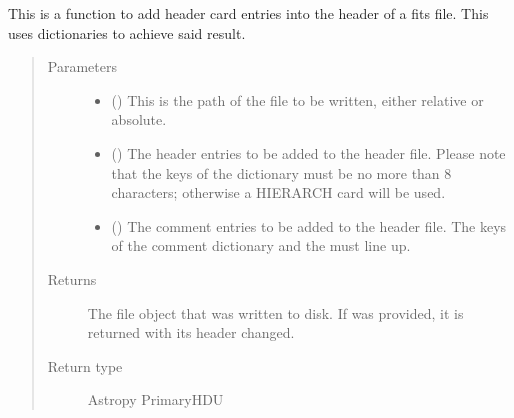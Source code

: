 \documentclass[letterpaper,10pt,english]{sphinxmanual}
\begin{document}
\begin{fulllineitems}
\label{\detokenize{docstrings/ifa_smeargle.core.io:ifa_smeargle.core.io.append_astropy_header_card}}
This is a function to add header card entries into the
header of a fits file. This uses dictionaries to achieve said
result.
\begin{quote}\begin{description}
\item[{Parameters}] \leavevmode\begin{itemize}
\item {} 
 () \textendash{} This is the path of the file to be written, either relative
or absolute.

\item {} 
 () \textendash{} The header entries to be added to the header file. Please
note that the keys of the dictionary must be no more than
8 characters; otherwise a HIERARCH card will be used.

\item {} 
 (\sphinxstyleliteralemphasis{\sphinxupquote{ (}}\sphinxstyleliteralemphasis{\sphinxupquote{)}}) \textendash{} The comment entries to be added to the header file. The
keys of the comment dictionary and the  must
line up.

\end{itemize}

\item[{Returns}] \leavevmode
{} \textendash{} The file object that was written to disk. If 
was provided, it is returned with its header changed.

\item[{Return type}] \leavevmode
Astropy PrimaryHDU

\end{description}\end{quote}

\end{fulllineitems}
\end{document}
